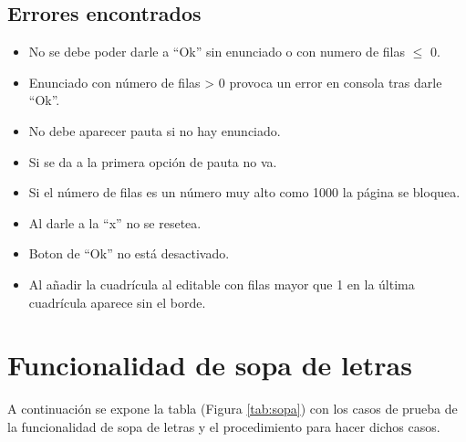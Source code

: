 \subsection{Errores encontrados}
\label{errores:desarrollo}
\begin{itemize}
    \item No se debe poder darle a ``Ok'' sin enunciado o con numero de filas $\leq$ 0.
    \item Enunciado con número de filas > 0 provoca un error en consola tras darle ``Ok''.
    \item No debe aparecer pauta si no hay enunciado.
    \item Si se da a la primera opción de pauta no va.
    \item Si el número de filas es un número muy alto como 1000 la página se bloquea.
    \item Al darle a la ``x'' no se resetea.
    \item Boton de ``Ok'' no está desactivado.
    \item  Al añadir la cuadrícula al editable con filas mayor que 1 en la última cuadrícula aparece sin el borde.

\end{itemize}

\section{Funcionalidad de sopa de letras}
\label{planPruebas:sopa}
A continuación se expone la tabla (Figura \ref{tab:sopa}) con los casos de prueba de la funcionalidad de sopa de letras y el procedimiento para hacer dichos casos.

